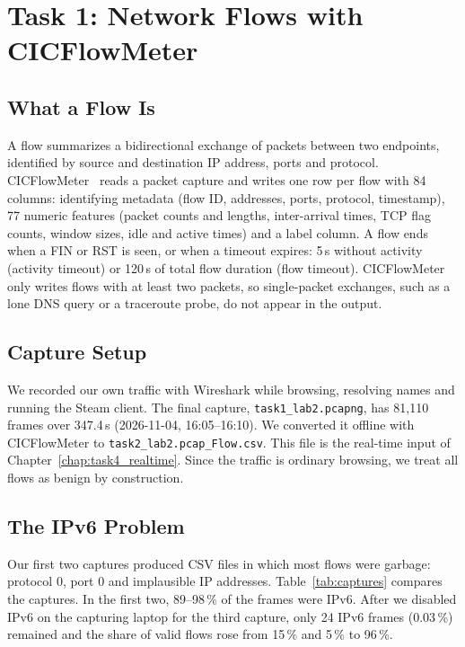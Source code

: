 \chapter{Task 1: Network Flows with CICFlowMeter}\label{chap:task1_flows}

\section{What a Flow Is}\label{sec:flow}

A flow summarizes a bidirectional exchange of packets between two endpoints, identified by source and destination IP address, ports and protocol. CICFlowMeter~\cite{lashkari2017cicflowmeter,cicflowmeter_github} reads a packet capture and writes one row per flow with 84 columns: identifying metadata (flow ID, addresses, ports, protocol, timestamp), 77 numeric features (packet counts and lengths, inter-arrival times, TCP flag counts, window sizes, idle and active times) and a label column. A flow ends when a FIN or RST is seen, or when a timeout expires: 5\,s without activity (activity timeout) or 120\,s of total flow duration (flow timeout). CICFlowMeter only writes flows with at least two packets, so single-packet exchanges, such as a lone DNS query or a traceroute probe, do not appear in the output.

\section{Capture Setup}\label{sec:capture}

We recorded our own traffic with Wireshark while browsing, resolving names and running the Steam client. The final capture, \texttt{task1\_lab2.pcapng}, has 81,110 frames over 347.4\,s (2026-11-04, 16:05--16:10). We converted it offline with CICFlowMeter to \texttt{task2\_lab2.pcap\_Flow.csv}. This file is the real-time input of Chapter~\ref{chap:task4_realtime}. Since the traffic is ordinary browsing, we treat all flows as benign by construction.

\section{The IPv6 Problem}\label{sec:ipv6}

Our first two captures produced CSV files in which most flows were garbage: protocol 0, port 0 and implausible IP addresses. Table~\ref{tab:captures} compares the captures. In the first two, 89--98\,\% of the frames were IPv6. After we disabled IPv6 on the capturing laptop for the third capture, only 24 IPv6 frames (0.03\,\%) remained and the share of valid flows rose from 15\,\% and 5\,\% to 96\,\%.


